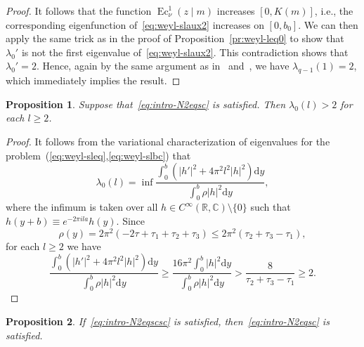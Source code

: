 \documentclass{amsart}
\let\le\leqslant
\let\ge\geqslant
\renewcommand{\d}{\mathrm{d}}
\DeclareMathOperator{\Ec}{Ec}
\theoremstyle{plain}
\newtheorem{proposition}{Proposition}[section]
\theoremstyle{definition}
\theoremstyle{remark}
\begin{document}
\begin{proof}
It follows that the function \(\Ec_\nu^1(z\mid m)\) increases \([0,K(m)]\),
i.e., the corresponding eigenfunction of~\eqref{eq:weyl-slaux2} increases on
\([0,b_0]\). We can then apply the same trick as in the proof of
Proposition~\ref{pr:weyl-leq0} to show that \(\lambda_0'\) is not the first
eigenvalue of~\eqref{eq:weyl-slaux2}. This contradiction shows that
\(\lambda_0'=2\). Hence, again by the same argument as
in~\cite[Proposition~11]{Kar2014} and~\cite[Proposition~3.15]{Mor2024}, we have
\(\lambda_{q-1}(1)=2\), which immediately implies the result.
\end{proof}

\begin{proposition}\label{pr:weyl-N2eqsc}
Suppose that~\eqref{eq:intro-N2eqsc} is satisfied. Then \(\lambda_0(l)>2\) for
each \(l\ge 2\).
\end{proposition}

\begin{proof}
It follows from the variational characterization of eigenvalues for the
problem~(\ref{eq:weyl-sleq},\ref{eq:weyl-slbc}) that
\[
\lambda_0(l)=\inf\frac{\int_0^b (|h'|^2+4\pi^2 l^2|h|^2)\d y}
{\int_0^b\rho|h|^2\d y},
\]
where the infimum is taken over all \(h\in C^\infty(\mathbb R,\mathbb
C)\setminus\{0\}\) such that \(h(y+b)\equiv e^{-2\pi ila}h(y)\). Since
\[
\rho(y)=2\pi^2(-2\tau+\tau_1+\tau_2+\tau_3)\le 2\pi^2(\tau_2+\tau_3-\tau_1),
\]
for each \(l\ge 2\) we have
\[
\frac{\int_0^b (|h'|^2+4\pi^2 l^2|h|^2)\d y}{\int_0^b\rho|h|^2\d y}
\ge
\frac{16\pi^2\int_0^b |h|^2\d y}{\int_0^b\rho|h|^2\d y}>
\frac{8}{\tau_2+\tau_3-\tau_1}\ge 2.
\]
\end{proof}

\begin{proposition}\label{pr:weyl-N2eqscsc}
If~\eqref{eq:intro-N2eqscsc} is satisfied, then~\eqref{eq:intro-N2eqsc} is
satisfied.
\end{proposition}
\end{document}
